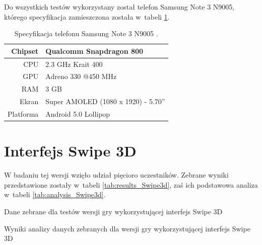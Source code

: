 \documentclass[a4paper,12pt,numbers=noenddot]{report}
\begin{document}
Do wszystkich testów wykorzystany został telefon Samsung Note 3 N9005, którego specyfikacja zamieszczona została w~tabeli \ref{tab:tab_telSpec}.

\begin{table}[H]
  \centering
  \caption{Specyfikacja telefonu Samsung Note 3 N9005 \cite{online_Note3Spec}.}
  \label{tab:tab_telSpec}
  \begin{tabular}{|r|l|}
    \hline
    Chipset & Qualcomm Snapdragon 800 \\
    \hline
    CPU & 2.3 GHz Krait 400\\
    \hline
    GPU & Adreno 330 @450 MHz\\
    \hline
    RAM & 3 GB\\
    \hline
    Ekran & Super AMOLED (1080 x 1920) - 5.70''\\
    \hline
    Platforma & Android 5.0 Lollipop\\
    \hline
  \end{tabular}
\end{table}


\section{Interfejs Swipe 3D}%
W badaniu tej wersji wzięło udział pięcioro uczestników. Zebrane wyniki przedstawione zostały w~tabeli \ref{tab:results_Swipe3d}, zaś ich podstawowa analiza w~tabeli \ref{tab:analysis_Swipe3d}. 

\begin{table}

  \caption{Dane zebrane dla testów wersji gry wykorzystującej interfejs Swipe 3D}
  \resizebox{\textwidth}{!}{%
	
  \end{tabular}%
  }
  \label{tab:results_Swipe3d}%
  \caption{Wyniki analizy danych zebranych dla wersji gry wykorzystującej interfejs Swipe 3D}
  \resizebox{\textwidth}{!}{%
	
  \end{tabular}%
  }
  \label{tab:analysis_Swipe3d}%
\end{table}%
\end{document}
